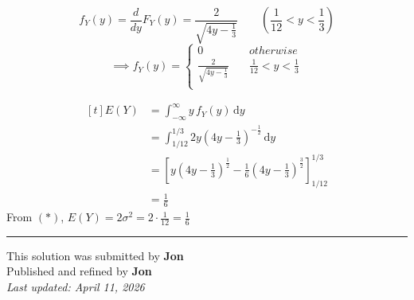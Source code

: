 ﻿\documentclass[12pt]{article}
\begin{document}
\[
f_Y(y)=\frac{d}{dy}F_Y(y)=\frac{2}{\sqrt{4y-\frac{1}{3}}}\qquad \left(\frac1{12}<y<\frac13\right)
\]
\[
\implies\boxed{
f_Y(y)=
\begin{cases}
0 & otherwise\\
\frac{2}{\sqrt{4y-\frac{1}{3}}}\quad& \frac1{12}<y<\frac13\\
\end{cases}
}
\]



\[
\begin{aligned}[t]
E(Y)&=\int_{-\infty}^{\infty} y\,f_Y(y)\,\mathrm{d}y\\
&=\int_{1/12}^{1/3} 2y(4y-\frac{1}{3})^{-\frac1{2}}\,\mathrm{d}y\\
&=\left[y\left(4y-\frac1{3}\right)^\frac1{2}-\frac{1}{6}\left(4y-\frac{1}{3}\right)^\frac{3}{2}\right]^{1/3}_{1/12}\\
&=\frac{1}{6}
\end{aligned}
\]
From $(*)$, $\displaystyle E(Y)=2\sigma^2=2\cdot \frac1{12}=\frac16$
\bigskip
\hrule

\begin{center}
    This solution was submitted by \textbf{Jon}\\[4pt]
    Published and refined by \textbf{Jon}\\[8pt]
	\textit{Last updated: April 11, 2026}
\end{center}
\end{document}

